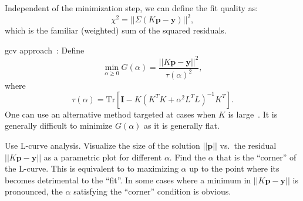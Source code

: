Independent of the minimization step, we can define the fit quality as:
\begin{equation}
   \chi^{2} = || \Sigma \left ( K \mathbf{p} - \mathbf{y} \right ) ||^{2} ,
\end{equation}
which is the familiar (weighted) sum of the squared residuals.




\gls{gcv} approach~\cite{1978-Craven-NM-31-377}:
Define
\begin{equation}
\label{eq:gcv}
   \min_{\alpha \geq 0} G ( \alpha ) = \frac{ || K \mathbf{p} - \mathbf{y} ||^{2} }{ \tau ( \alpha )^{2} } ,
\end{equation}
where
\begin{equation}
   \tau ( \alpha ) = \mathrm{Tr} \left [ \mathbf{I} - K \left ( K^{T} K + \alpha^{2} L^{T} L \right )^{-1} K^{T} \right ] .
\end{equation}
One can use an alternative method targeted at cases when $K$ is large~\cite{1997-Golub-JCGS-6-1}.
It is generally difficult to minimize $G ( \alpha )$ as it is generally flat.



Use L-curve analysis.
Visualize the size of the solution $|| \mathbf{p} ||$ vs.\ the residual $|| K \mathbf{p} - \mathbf{y} ||$ as a parametric plot for different $\alpha$.
Find the $\alpha$ that is the ``corner'' of the L-curve.
This is equivalent to to maximizing $\alpha$ up to the point where its becomes detrimental to the ``fit''.
In some cases where a minimum in $|| K \mathbf{p} - \mathbf{y} ||$ is pronounced, the $\alpha$ satisfying the ``corner'' condition is obvious.